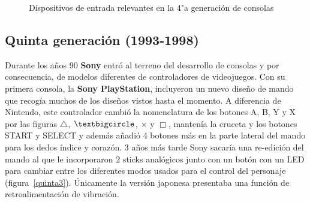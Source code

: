 \begin{figure}[t]
     \hfill
{}
     \hfill
     \caption{Dispositivos de entrada relevantes en la 4"a  generaci\'on de consolas}
     \label{fig:cuarta}
   \end{figure}

\subsection{Quinta generaci\'on (1993-1998)}



Durante los a\~nos 90 \textbf{Sony} entr\'o al terreno del desarrollo de consolas y por consecuencia, de modelos diferentes de controladores de videojuegos. Con su primera consola, la \textbf{Sony PlayStation}, incluyeron un nuevo dise\~no de mando que recog\'ia muchos de los dise\~nos vistos hasta el momento. A diferencia de Nintendo, este controlador cambi\'o la nomenclatura de los botones A, B, Y y X por las figuras $\triangle$, $\textbigcircle$, $\times$ y $\Box$, manten\'ia la cruceta y los botones START y SELECT y adem\'as a\~nadi\'o 4 botones m\'as en la parte lateral del mando para los dedos \'indice y coraz\'on. 3 a\~nos m\'as tarde Sony sacar\'ia una re-edici\'on del mando al que le incorporaron 2 sticks anal\'ogicos junto con un bot\'on con un LED para cambiar entre los diferentes modos usados para el control del personaje (figura~\ref{quinta3}). \'Unicamente la versi\'on japonesa presentaba una funci\'on de retroalimentaci\'on de vibraci\'on. \\

